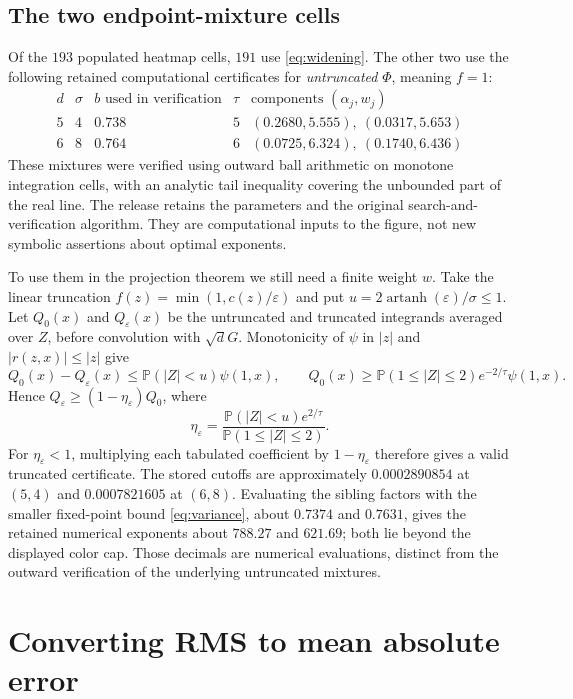 \documentclass[11pt]{article}
\theoremstyle{definition}
\theoremstyle{remark}
\DeclareMathOperator{\artanh}{artanh}
\newcommand{\Prob}{\mathbb P}
\begin{document}
\subsection{The two endpoint-mixture cells}
Of the $193$ populated heatmap cells, $191$ use \eqref{eq:widening}.
The other two use the following retained computational certificates for
\emph{untruncated} $\Phi$, meaning $f=1$:
\[
\begin{array}{c|cccl}
 d&\sigma&b\text{ used in verification}&\tau&\text{components }(\alpha_j,w_j)\\\hline
 5&4&0.738&5&(0.2680,5.555),\ (0.0317,5.653)\\
 6&8&0.764&6&(0.0725,6.324),\ (0.1740,6.436)
\end{array}
\]
These mixtures were verified using outward ball arithmetic on monotone
integration cells, with an analytic tail inequality covering the unbounded
part of the real line. The release retains the parameters and the original
search-and-verification algorithm. They are computational inputs to the
figure, not new symbolic assertions about optimal exponents.

To use them in the projection theorem we still need a finite weight $w$.
Take the linear truncation $f(z)=\min(1,c(z)/\varepsilon)$ and put
$u=2\artanh(\varepsilon)/\sigma\le1$.
Let $Q_0(x)$ and $Q_\varepsilon(x)$ be the untruncated and truncated
integrands averaged over $Z$, before convolution with $\sqrt d G$.
Monotonicity of $\psi$ in $|z|$ and $|r(z,x)|\le |z|$ give
\[
 Q_0(x)-Q_\varepsilon(x)\le\Prob(|Z|<u)\psi(1,x),\qquad
 Q_0(x)\ge\Prob(1\le|Z|\le2)e^{-2/\tau}\psi(1,x).
\]
Hence $Q_\varepsilon\ge(1-\eta_\varepsilon)Q_0$, where
\[
 \eta_\varepsilon=
 \frac{\Prob(|Z|<u)e^{2/\tau}}{\Prob(1\le|Z|\le2)}.
\]
For $\eta_\varepsilon<1$, multiplying each tabulated coefficient by
$1-\eta_\varepsilon$ therefore gives a valid truncated certificate.
The stored cutoffs are approximately $0.0002890854$ at $(5,4)$ and
$0.0007821605$ at $(6,8)$. Evaluating the sibling factors with the smaller
fixed-point bound \eqref{eq:variance}, about $0.7374$ and $0.7631$, gives
the retained numerical exponents about $788.27$ and $621.69$; both lie beyond the displayed color cap.
Those decimals are numerical evaluations, distinct from the outward
verification of the underlying untruncated mixtures.

\clearpage
\section{Converting RMS to mean absolute error}
\label{app:lone}
\end{document}
